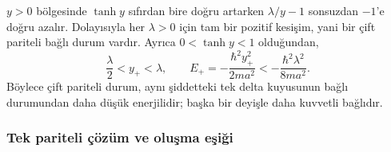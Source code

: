 \documentclass[00_kitap.tex]{subfiles}
\begin{document}
$y>0$ bölgesinde $\tanh y$ sıfırdan bire doğru artarken
$\lambda/y-1$ sonsuzdan $-1$'e doğru azalır. Dolayısıyla her
$\lambda>0$ için tam bir pozitif kesişim, yani bir çift pariteli
bağlı durum vardır. Ayrıca $0<\tanh y<1$ olduğundan,
\begin{equation}
 \frac{\lambda}{2}<y_+<\lambda,
 \qquad
 E_+=-\frac{\hbar^2y_+^2}{2ma^2}
       <-\frac{\hbar^2\lambda^2}{8ma^2}.
 \label{eq:cift_delta_cift_sinir}
\end{equation}
Böylece çift pariteli durum, aynı şiddetteki tek delta kuyusunun
bağlı durumundan daha düşük enerjilidir; başka bir deyişle daha
kuvvetli bağlıdır.

\subsubsection{Tek pariteli çözüm ve oluşma eşiği}
\end{document}
